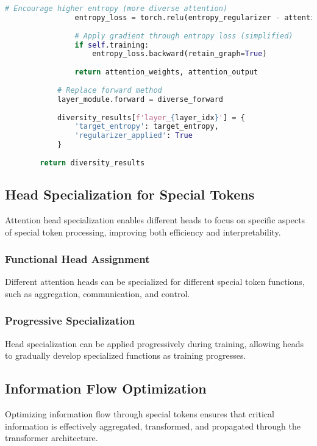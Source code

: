 \begin{lstlisting}[language=Python, caption=Attention pattern analysis and optimization framework]
                # Encourage higher entropy (more diverse attention)
                entropy_loss = torch.relu(entropy_regularizer - attention_entropy).mean()
                
                # Apply gradient through entropy loss (simplified)
                if self.training:
                    entropy_loss.backward(retain_graph=True)
                
                return attention_weights, attention_output
            
            # Replace forward method
            layer_module.forward = diverse_forward
            
            diversity_results[f'layer_{layer_idx}'] = {
                'target_entropy': target_entropy,
                'regularizer_applied': True
            }
        
        return diversity_results
\end{lstlisting}

\subsection{Head Specialization for Special Tokens}

Attention head specialization enables different heads to focus on specific aspects of special token processing, improving both efficiency and interpretability.

\subsubsection{Functional Head Assignment}

Different attention heads can be specialized for different special token functions, such as aggregation, communication, and control.

\subsubsection{Progressive Specialization}

Head specialization can be applied progressively during training, allowing heads to gradually develop specialized functions as training progresses.

\subsection{Information Flow Optimization}

Optimizing information flow through special tokens ensures that critical information is effectively aggregated, transformed, and propagated through the transformer architecture.

